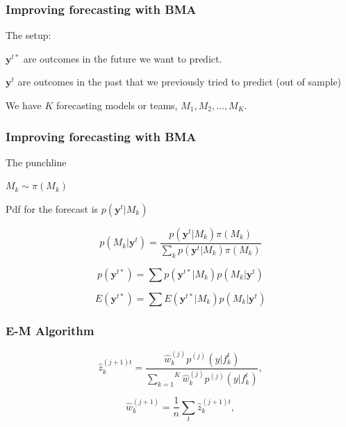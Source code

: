 \documentclass[xcolor=dvipsnames]{beamer}
\begin{document}
\begin{frame}
\frametitle{Improving forecasting with BMA}

The setup:
\bis
\item $\mathbf{y}^{t\ast}$ are outcomes in the future we want to
  predict.
\item $\mathbf{y}^{t}$ are outcomes in the past that we previously
  tried to predict (out of sample)
\item We have $K$ forecasting models or teams, $M_1, M_2, \ldots, M_K$.
\ei

\end{frame}


\begin{frame}
\frametitle{Improving forecasting with BMA}

The punchline
\bis
\item $M_k \sim \pi(M_k)$
\item Pdf for the forecast is $p(\mathbf{y}^t |M_k)$
\item $$p(M_k | \mathbf{y}^t)  =
  \frac{p(\mathbf{y}^t|M_k)\pi(M_k)}{\sum_k
    p(\mathbf{y}^t|M_k)\pi(M_k)}$$
\item $$p(\mathbf{y}^{t\ast}) = \sum
  p(\mathbf{y}^{t\ast}|M_k)p(M_k|\mathbf{y}^t)$$
\item $$E(\mathbf{y}^{t\ast}) = \sum E(\mathbf{y}^{t\ast}|M_k)p(M_k|\mathbf{y}^t)$$

\ei

\end{frame}






\begin{frame}
\frametitle{E-M Algorithm}

\begin{equation}
\label{E-step}
\hat{z}^{(j+1)t}_{k} = \frac{\hat{w}^{(j)}_k
p^{(j)}(y|f_{k}^{t})}{\overset{K}{\underset{k=1}{\sum}}\hat{w}^{(j)}_kp^{(j)}(y|f_{k}^{t})},
\end{equation}


\begin{equation}
\label{M-step}
\hat{w}^{(j+1)}_k=\frac{1}{n}\underset{t}{\sum}\hat{z}^{(j+1)t}_{k},
\end{equation}


\end{frame}
\end{document}
